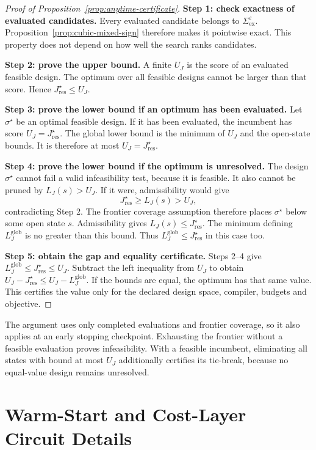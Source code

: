 \documentclass[a4paper,onecolumn,11pt,unpublished]{quantumarticle}
\theoremstyle{remark}
\begin{document}
\begin{proof}[Proof of Proposition~\ref{prop:anytime-certificate}]
\textbf{Step 1: check exactness of evaluated candidates.}
Every evaluated candidate belongs to $\Sigma_{\mathrm{ex}}^\varepsilon$.
Proposition~\ref{prop:cubic-mixed-sign} therefore makes it pointwise exact.
This property does not depend on how well the search ranks candidates.

\textbf{Step 2: prove the upper bound.}
A finite $U_J$ is the score of an evaluated feasible design.
The optimum over all feasible designs cannot be larger than that score.
Hence $J_{\mathrm{res}}^\star\leq U_J$.

\textbf{Step 3: prove the lower bound if an optimum has been evaluated.}
Let $\sigma^\star$ be an optimal feasible design.
If it has been evaluated, the incumbent has score
$U_J=J_{\mathrm{res}}^\star$.
The global lower bound is the minimum of $U_J$ and the open-state bounds.
It is therefore at most $U_J=J_{\mathrm{res}}^\star$.

\textbf{Step 4: prove the lower bound if the optimum is unresolved.}
The design $\sigma^\star$ cannot fail a valid infeasibility test, because
it is feasible. It also cannot be pruned by $L_J(s)>U_J$.
If it were, admissibility would give
\[
J_{\mathrm{res}}^\star\geq L_J(s)>U_J,
\]
contradicting Step 2.
The frontier coverage assumption therefore places $\sigma^\star$ below
some open state $s$. Admissibility gives
$L_J(s)\leq J_{\mathrm{res}}^\star$.
The minimum defining $L_J^{\mathrm{glob}}$ is no greater than this bound.
Thus $L_J^{\mathrm{glob}}\leq J_{\mathrm{res}}^\star$ in this case too.

\textbf{Step 5: obtain the gap and equality certificate.}
Steps 2--4 give
$L_J^{\mathrm{glob}}\leq J_{\mathrm{res}}^\star\leq U_J$.
Subtract the left inequality from $U_J$ to obtain
$U_J-J_{\mathrm{res}}^\star\leq U_J-L_J^{\mathrm{glob}}$.
If the bounds are equal, the optimum has that same value.
This certifies the value only for the declared design space, compiler,
budgets and objective.
\end{proof}
The argument uses only completed evaluations and frontier coverage, so it
also applies at an early stopping checkpoint.  Exhausting the frontier
without a feasible evaluation proves infeasibility.  With a feasible
incumbent, eliminating all states with bound at most $U_J$ additionally
certifies its tie-break, because no equal-value design remains unresolved.

\section{Warm-Start and Cost-Layer Circuit Details}
\label{app:warm-start-circuits}
\end{document}
